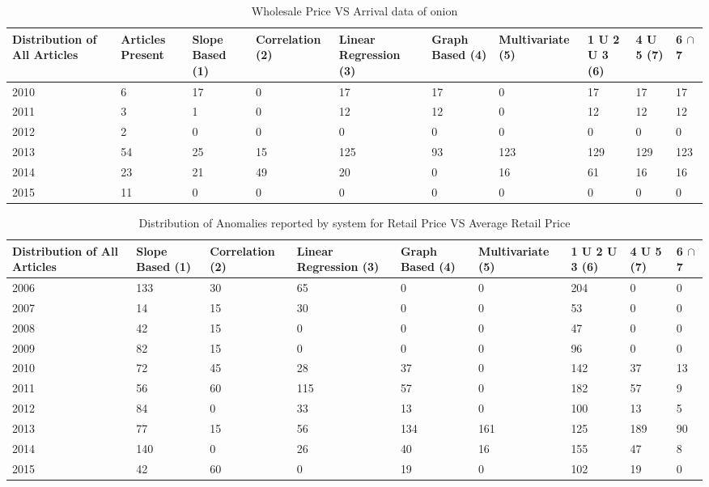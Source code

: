 \documentclass[a4paper,10pt]{report}
\begin{document}
	
	
	\begin{table}[]
	\centering
	\resizebox{\textwidth}{!}
	{\begin{tabular}{|l|l|l|l|l|l|l|l|l|l|}
	\hline
	Distribution of All Articles & Articles Present & Slope Based (1) & Correlation (2) & Linear Regression (3) & Graph Based (4) & Multivariate (5) & 1 U 2 U 3 (6) & 4 U 5 (7) & 6 $\cap$ 7  \\
	\hline
	2010 & 6  & 17 & 0  & 17  & 17 & 0   & 17  & 17  & 17  \\
	\hline
	2011 & 3  & 1  & 0  & 12  & 12 & 0   & 12  & 12  & 12  \\
	\hline
	2012 & 2  & 0  & 0  & 0   & 0  & 0   & 0   & 0   & 0   \\
	\hline
	2013 & 54 & 25 & 15 & 125 & 93 & 123 & 129 & 129 & 123 \\
	\hline
	2014 & 23 & 21 & 49 & 20  & 0  & 16  & 61  & 16  & 16  \\
	\hline
	2015 & 11 & 0  & 0  & 0   & 0  & 0   & 0   & 0   & 0   \\
	\hline
	\end{tabular}}	
	\caption{ Wholesale Price VS Arrival data of onion}
	\label{WholesaleVsArrival}
	\end{table}
	
	
	
	
	\begin{table}[]
	\centering
	\resizebox{\textwidth}{!}
	{\begin{tabular}{|l|l|l|l|l|l|l|l|l|}
	\hline
	Distribution of All Articles & Slope Based (1) & Correlation (2) & Linear Regression (3) & Graph Based (4) & Multivariate (5) & 1 U 2 U 3 (6) & 4 U 5 (7) & 6 $\cap$ 7 \\
	\hline
	2006 & 133 & 30 & 65  & 0   & 0   & 204 & 0   & 0  \\
	\hline
	2007 & 14  & 15 & 30  & 0   & 0   & 53  & 0   & 0  \\
	\hline
	2008 & 42  & 15 & 0   & 0   & 0   & 47  & 0   & 0  \\
	\hline
	2009 & 82  & 15 & 0   & 0   & 0   & 96  & 0   & 0  \\
	\hline
	2010 & 72  & 45 & 28  & 37  & 0   & 142 & 37  & 13 \\
	\hline
	2011 & 56  & 60 & 115 & 57  & 0   & 182 & 57  & 9  \\
	\hline
	2012 & 84  & 0  & 33  & 13  & 0   & 100 & 13  & 5  \\
	\hline
	2013 & 77  & 15 & 56  & 134 & 161 & 125 & 189 & 90 \\
	\hline
	2014 & 140 & 0  & 26  & 40  & 16  & 155 & 47  & 8  \\
	\hline
	2015 & 42  & 60 & 0   & 19  & 0   & 102 & 19  & 0  \\
	\hline
	\end{tabular}}
	\caption{Distribution of Anomalies reported by system for Retail Price VS Average Retail Price}
	\label{RetailVsAverageDist}
	\end{table}
	  
\end{document}
